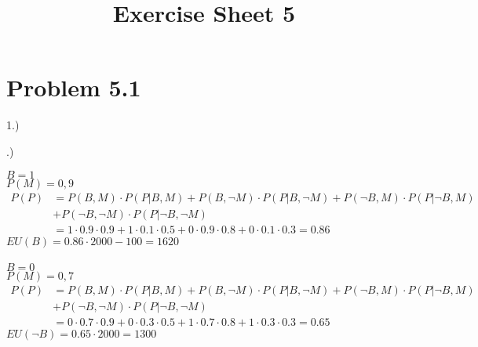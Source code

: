 \documentclass[a4paper]{article}
\title{Exercise Sheet 5}
\begin{document}
\maketitle

\section*{Problem 5.1}
1.)


.)

$B = 1$\\
$P(M) = 0,9$
\begin{align*}
    P(P) &= P(B,M) \cdot P(P|B,M) + P(B, \lnot M) \cdot P(P|B,\lnot M) + P(\lnot B, M) \cdot P(P|\lnot B, M) \\
    &+ P(\lnot B, \lnot M) \cdot P(P|\lnot B, \lnot M)\\
    &= 1\cdot 0.9\cdot 0.9 + 1\cdot 0.1 \cdot 0.5 + 0 \cdot 0.9 \cdot 0.8 + 0 \cdot 0.1 \cdot 0.3 = 0.86
\end{align*}
$EU(B) = 0.86 \cdot 2000 - 100 = 1620$
\\
\\

$B = 0$\\
$P(M) = 0,7$
\begin{align*}
    P(P) &= P(B,M) \cdot P(P|B,M) + P(B, \lnot M) \cdot P(P|B,\lnot M) + P(\lnot B, M) \cdot P(P|\lnot B, M) \\
    &+ P(\lnot B, \lnot M) \cdot P(P|\lnot B, \lnot M)\\
    &= 0\cdot 0.7\cdot 0.9 + 0\cdot 0.3 \cdot 0.5 + 1 \cdot 0.7 \cdot 0.8 + 1 \cdot 0.3 \cdot 0.3 = 0.65
\end{align*}
$EU(\lnot B) = 0.65 \cdot 2000 = 1300$

\newpage
\end{document}
